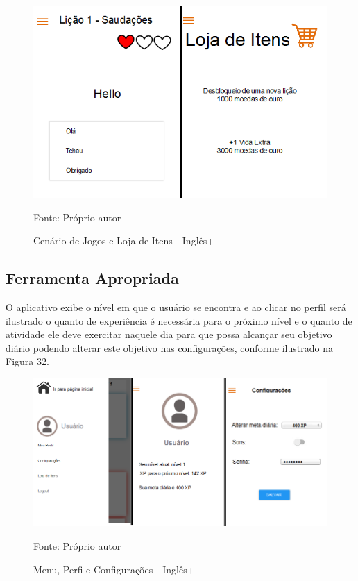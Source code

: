 \documentclass[
	12pt,				%
	openany,			%
	oneside,			%
	a4paper,			%
	english,			%
	french,				%
	spanish,			%
	brazil				%
	]{abntex2}
\begin{document}
\begin{figure}[H]
    \centering
\caption{Cenário de Jogos e Loja de Itens - Inglês+}
\includegraphics[width=12cm]{figuras/divertimento-ingles+.png}
\par
 Fonte: Próprio autor
\end{figure}

\subsection{Ferramenta Apropriada}
O aplicativo exibe o nível em que o usuário se encontra e ao clicar no perfil será ilustrado o quanto de experiência é necessária para o próximo nível e o quanto de atividade ele deve exercitar naquele dia para que possa alcançar seu objetivo diário podendo alterar este objetivo nas configurações, conforme ilustrado na Figura 32.

\begin{figure}[H]
    \centering
\caption{Menu, Perfi e Configurações - Inglês+}
\includegraphics[width=12cm]{figuras/perfil-ingles+.png}
\par
 Fonte: Próprio autor
\end{figure}
\end{document}

